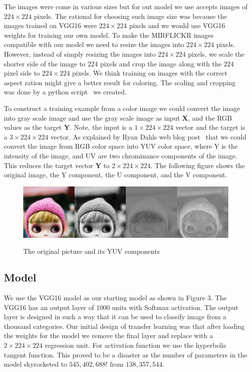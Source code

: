 \documentclass[12pt]{article}
\begin{document}
The images were come in various sizes but for out model we use accepts images of $224\times224$ pixels. The rational for choosing such image size was because the images trained on VGG16 were $224\times224$ pixels and we would use VGG16 weights for training our own model. To make the MIRFLICKR images compatible with our model we need to resize the images into $224\times224$ pixels. However, instead of simply resizing the images into $224\times224$ pixels, we scale the shorter side of the image to $224$ pixels and crop the image along with the $224$ pixel side to  $224\times224$ pixels. We think training on images with the correct aspect ration might give a better result for coloring. The scaling and cropping was done by a python script~\cite{PYDATA} we created.

To construct a training example from a color image we could convert the image into gray scale image and use the gray scale image as input $\boldsymbol{X}$, and the RGB values as the target $\boldsymbol{Y}$. Note, the input is a $1\times224\times224$ vector and the target is a $3\times224\times224$ vector. As explained by Ryan Dahl\textquotesingle s web blog post~\cite{RYAN2016} that we could convert the image from RGB color space into YUV color space, where Y is the intensity of the image, and UV are two chrominance components of the image. This reduces the target vector $\boldsymbol{Y}$ to $2\times224\times224$. The following figure shows the original image, the Y component, the U component, and the V component. 

\begin{figure}[!ht]
 \centering
  \includegraphics[width=5.0in]{resource/YUV.png}
 \label{yuvimage}
 \caption{The original picture and its YUV components}
\end{figure}


\subsection{Model}
We use the VGG16 model as our starting model as shown in Figure 3. The VGG16 has an output layer of $1000$ units with Softmax activation. The output layer is designed in such a way that it can be used to classify image from a thousand categories. Our initial design of transfer learning was that after loading the weights for the model we remove the final layer and replace with a $2\times224\times224$ regression unit. For activation function we use the hyperbolic tangent function. This proved to be a disaster as the number of parameters in the model skyrocketed to $545,402,688$! from  $138,357,544$. 
\end{document}
